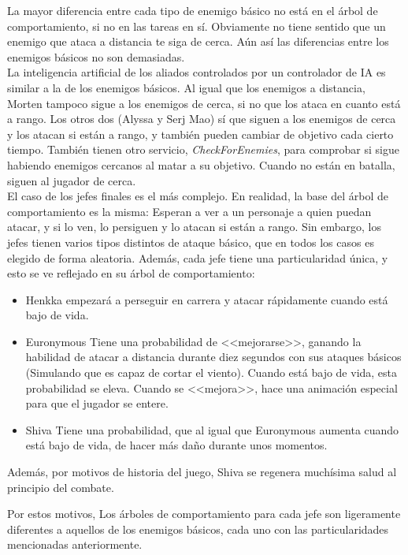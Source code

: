 La mayor diferencia entre cada tipo de enemigo básico no está en el árbol de comportamiento, si no en las tareas en sí. Obviamente no tiene sentido que un enemigo que ataca a distancia te siga de cerca. Aún así las diferencias entre los enemigos básicos no son demasiadas.
\\

La inteligencia artificial de los aliados controlados por un controlador de {IA} es similar a la de los enemigos básicos. Al igual que los enemigos a distancia, Morten tampoco sigue a los enemigos de cerca, si no que los ataca en cuanto está a rango. Los otros dos (Alyssa y Serj Mao) sí que siguen a los enemigos de cerca y los atacan si están a rango, y también pueden cambiar de objetivo cada cierto tiempo. También tienen otro servicio, \textit{CheckForEnemies}, para comprobar si sigue habiendo enemigos cercanos al matar a su objetivo. Cuando no están en batalla, siguen al jugador de cerca.
\\

El caso de los jefes finales es el más complejo. En realidad, la base del árbol de comportamiento es la misma: Esperan a ver a un personaje a quien puedan atacar, y si lo ven, lo persiguen y lo atacan si están a rango. Sin embargo, los jefes tienen varios tipos distintos de ataque básico, que en todos los casos es elegido de forma aleatoria. Además, cada jefe tiene una particularidad única, y esto se ve reflejado en su árbol de comportamiento:

\begin{itemize}
\item Henkka empezará a perseguir en carrera y atacar rápidamente cuando está bajo de vida.
\item Euronymous Tiene una probabilidad de <<mejorarse>>, ganando la habilidad de atacar a distancia durante diez segundos con sus ataques básicos (Simulando que es capaz de cortar el viento). Cuando está bajo de vida, esta probabilidad se eleva. Cuando se <<mejora>>, hace una animación especial para que el jugador se entere.
\item Shiva Tiene una probabilidad, que al igual que Euronymous aumenta cuando está bajo de vida, de hacer más daño durante unos momentos.
\end{itemize}

Además, por motivos de historia del juego, Shiva se regenera muchísima salud al principio del combate.


Por estos motivos, Los árboles de comportamiento para cada jefe son ligeramente diferentes a aquellos de los enemigos básicos, cada uno con las particularidades mencionadas anteriormente.


